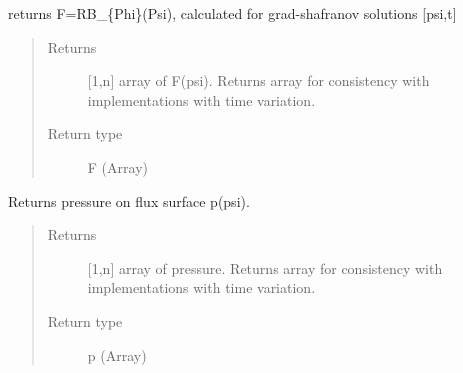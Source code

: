 \documentclass[letterpaper,10pt,english]{sphinxmanual}
\begin{document}
\begin{fulllineitems}
\begin{fulllineitems}
\begin{quote}
\begin{description}
\end{description}\end{quote}

\end{fulllineitems}


\begin{fulllineitems}
\label{\detokenize{eqtools:eqtools.eqdskreader.EqdskReader.getF}}
returns F=RB\_\{Phi\}(Psi), calculated for grad-shafranov solutions
{[}psi,t{]}
\begin{quote}\begin{description}
\item[{Returns}] \leavevmode
{[}1,n{]} array of F(psi).  Returns array for
consistency with
{\hyperref[\detokenize{eqtools:eqtools.core.Equilibrium}]{}}
implementations with time variation.

\item[{Return type}] \leavevmode
F (Array)

\end{description}\end{quote}

\end{fulllineitems}


\begin{fulllineitems}
\label{\detokenize{eqtools:eqtools.eqdskreader.EqdskReader.getFluxPres}}
Returns pressure on flux surface p(psi).
\begin{quote}\begin{description}
\item[{Returns}] \leavevmode
{[}1,n{]} array of pressure.  Returns array for
consistency with
{\hyperref[\detokenize{eqtools:eqtools.core.Equilibrium}]{}}
implementations with time variation.

\item[{Return type}] \leavevmode
p (Array)

\end{description}\end{quote}


\end{fulllineitems}
\end{fulllineitems}
\end{document}
